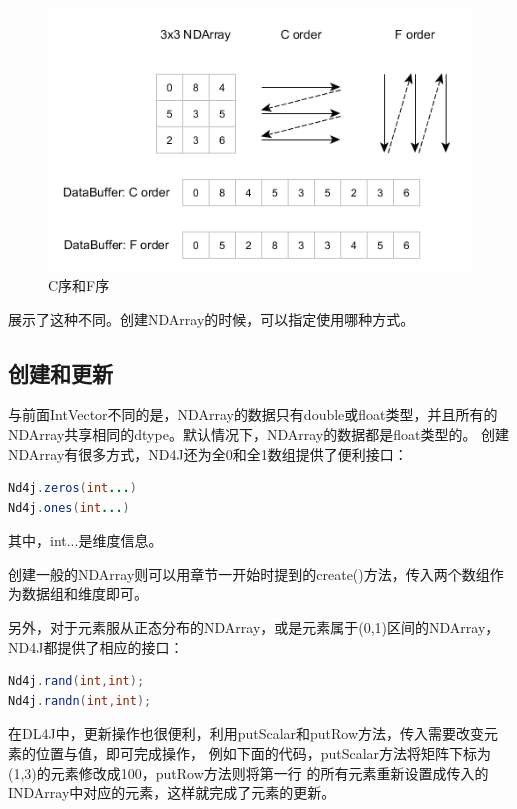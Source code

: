 \begin{figure}[!htb]
\centerline{\includegraphics[width=.35\figwidth]{images/c_vs_f_order.png}}
\label{fig:part3_c_vs_f_order}
\caption{C序和F序}
\end{figure}

\noindent
{}展示了这种不同。创建NDArray的时候，可以指定使用哪种方式。

\subsection{创建和更新}
与前面IntVector不同的是，NDArray的数据只有double或float类型，并且所有的NDArray共享相同的dtype。默认情况下，NDArray的数据都是float类型的。
创建NDArray有很多方式，ND4J还为全0和全1数组提供了便利接口：
\vspace{0.3cm}

\begin{lstlisting}[language=Java]
Nd4j.zeros(int...)
Nd4j.ones(int...)
\end{lstlisting}
\noindent
其中，int...是维度信息。

创建一般的NDArray则可以用章节一开始时提到的create()方法，传入两个数组作为数据组和维度即可。

另外，对于元素服从正态分布的NDArray，或是元素属于(0,1)区间的NDArray，ND4J都提供了相应的接口：
\begin{lstlisting}[language=Java]
Nd4j.rand(int,int);
Nd4j.randn(int,int);
\end{lstlisting}

在DL4J中，更新操作也很便利，利用putScalar和putRow方法，传入需要改变元素的位置与值，即可完成操作，
例如下面的代码，putScalar方法将矩阵下标为(1,3)的元素修改成100，putRow方法则将第一行
的所有元素重新设置成传入的INDArray中对应的元素，这样就完成了元素的更新。

